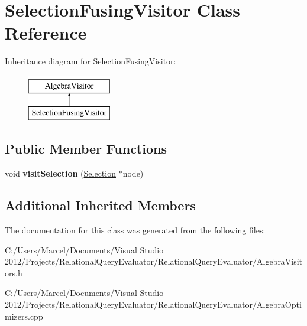 \hypertarget{class_selection_fusing_visitor}{\section{Selection\+Fusing\+Visitor Class Reference}
\label{class_selection_fusing_visitor}
}
Inheritance diagram for Selection\+Fusing\+Visitor\+:\begin{figure}[H]
\begin{center}
\leavevmode
\includegraphics[height=2.000000cm]{class_selection_fusing_visitor}
\end{center}
\end{figure}
\subsection*{Public Member Functions}
\begin{DoxyCompactItemize}
\item 
\hypertarget{class_selection_fusing_visitor_af7999d106685c9938c907c6984ba4f2d}{void {\bfseries visit\+Selection} (\hyperlink{class_selection}{Selection} $\ast$node)}\label{class_selection_fusing_visitor_af7999d106685c9938c907c6984ba4f2d}

\end{DoxyCompactItemize}
\subsection*{Additional Inherited Members}


The documentation for this class was generated from the following files\+:\begin{DoxyCompactItemize}
\item 
C\+:/\+Users/\+Marcel/\+Documents/\+Visual Studio 2012/\+Projects/\+Relational\+Query\+Evaluator/\+Relational\+Query\+Evaluator/Algebra\+Visitors.\+h\item 
C\+:/\+Users/\+Marcel/\+Documents/\+Visual Studio 2012/\+Projects/\+Relational\+Query\+Evaluator/\+Relational\+Query\+Evaluator/Algebra\+Optimizers.\+cpp\end{DoxyCompactItemize}
